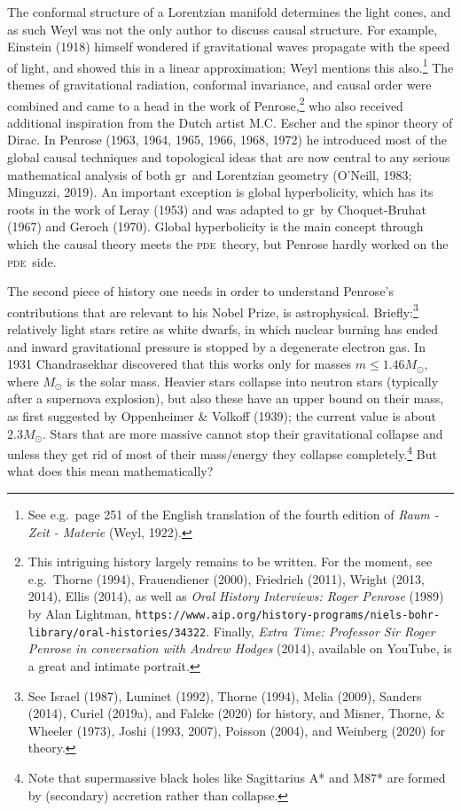 \documentclass[12pt]{article}
\newcommand{\pde}{\textsc{pde}}
\newcommand{\GR}{{\sc gr}}
\begin{document}
The conformal structure of a Lorentzian manifold determines the light cones, and as such
 Weyl was not the only author to discuss causal structure. For example, Einstein (1918) himself wondered if gravitational waves propagate with the speed of light, and showed this in a linear approximation; Weyl mentions this also.\footnote{See e.g.\ page 251 of the English translation of the fourth edition of  \emph{Raum - Zeit - Materie} (Weyl, 1922).} 
The themes of gravitational radiation, conformal invariance,  and causal order were combined and came to a head in the work of Penrose,\footnote{This intriguing history largely remains to be written. For the moment, see e.g.\ Thorne (1994), Frauendiener  (2000), Friedrich (2011),  Wright (2013, 2014), Ellis (2014), as well as \emph{Oral History Interviews: Roger Penrose} (1989) by Alan Lightman, \texttt{https://www.aip.org/history-programs/niels-bohr-library/oral-histories/34322}. Finally,
\emph{Extra Time: Professor Sir Roger Penrose in conversation with Andrew Hodges} (2014), available on YouTube, is a great and intimate portrait.
 } who also received additional inspiration from the Dutch artist M.C. Escher and the spinor theory of Dirac.
 In Penrose (1963, 1964, 1965, 1966, 1968, 1972) he introduced most of the global causal techniques and topological ideas   that are now central to any serious mathematical analysis of both \GR\ and Lorentzian geometry (O'Neill, 1983; Minguzzi, 2019). An important exception is global hyperbolicity, which has its roots in the work of Leray (1953) and was adapted to \GR\ by Choquet-Bruhat (1967) and Geroch (1970). Global hyperbolicity is the main concept through which the causal theory meets the \pde\ theory, but Penrose  hardly worked on the \pde\ side. 

The second piece of history one needs in order to understand Penrose's  contributions that are relevant to his Nobel Prize, is astrophysical. Briefly:\footnote{See  Israel (1987), Luminet (1992), Thorne (1994),  Melia (2009),  Sanders (2014), 
Curiel (2019a), and Falcke (2020)  for history, 
and Misner, Thorne, \& Wheeler (1973), Joshi (1993, 2007),   Poisson (2004), and  Weinberg (2020) for theory.} relatively light stars retire as white dwarfs, in which nuclear burning has ended and inward gravitational pressure is stopped by a degenerate electron gas. In 1931 Chandrasekhar  discovered that this works only for masses $m\leq 1.46 M_{\odot}$, where $M_{\odot}$ is the solar mass. Heavier stars collapse into neutron stars (typically after a supernova explosion), but also these have an upper bound on their mass, as first suggested by Oppenheimer \& Volkoff (1939); the current value is about $2.3  M_{\odot}$.  Stars that are more massive cannot stop their gravitational collapse and unless they get rid of most of their mass/energy they collapse completely.\footnote{Note that supermassive black holes like Sagittarius A* and M87* are formed by (secondary) accretion rather than collapse.}
 But what  does this mean mathematically?
\end{document}
